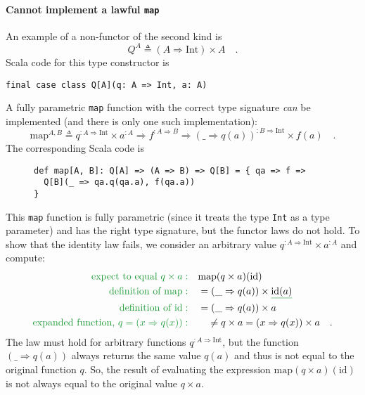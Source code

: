 \paragraph{Cannot implement a lawful \lstinline!map! }

An example of a non-functor of the second kind is 
\[
Q^{A}\triangleq\left(A\Rightarrow\text{Int}\right)\times A\quad.
\]
Scala code for this type constructor is
\begin{lstlisting}
final case class Q[A](q: A => Int, a: A)
\end{lstlisting}
A fully parametric \lstinline!map! function with the correct type
signature \emph{can} be implemented (and there is only one such implementation):
\[
\text{map}^{A,B}\triangleq q^{:A\Rightarrow\text{Int}}\times a^{:A}\Rightarrow f^{:A\Rightarrow B}\Rightarrow(\_\Rightarrow q(a))^{:B\Rightarrow\text{Int}}\times f(a)\quad.
\]
The corresponding Scala code is

\begin{wrapfigure}{l}{0.55\columnwidth}%
\vspace{-0.6\baselineskip}

\begin{lstlisting}
def map[A, B]: Q[A] => (A => B) => Q[B] = { qa => f =>
  Q[B](_ => qa.q(qa.a), f(qa.a)) 
}
\end{lstlisting}
\vspace{-0.8\baselineskip}
\end{wrapfigure}%

\noindent This \lstinline!map! function is fully parametric (since
it treats the type \lstinline!Int! as a type parameter) and has the
right type signature, but the functor laws do not hold. To show that
the identity law fails, we consider an arbitrary value $q^{:A\Rightarrow\text{Int}}\times a^{:A}$
and compute:
\begin{align*}
{\color{greenunder}\text{expect to equal }q\times a:}\quad & \text{map}(q\times a)(\text{id})\\
{\color{greenunder}\text{definition of }\text{map}:}\quad & =(\_\Rightarrow q(a))\times\gunderline{\text{id}(a)}\\
{\color{greenunder}\text{definition of }\text{id}:}\quad & =(\_\Rightarrow q(a))\times a\\
{\color{greenunder}\text{expanded function, }q=\left(x\Rightarrow q(x)\right):}\quad & \quad\neq q\times a=(x\Rightarrow q(x))\times a\quad.
\end{align*}
The law must hold for arbitrary functions $q^{:A\Rightarrow\text{Int}}$,
but the function $\left(\_\Rightarrow q(a)\right)$ always returns
the same value $q(a)$ and thus is not equal to the original function
$q$. So, the result of evaluating the expression $\text{map}(q\times a)(\text{id})$
is not always equal to the original value $q\times a$. 

